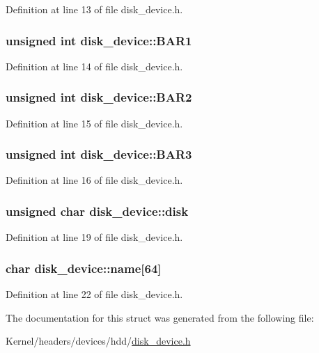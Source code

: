 Definition at line 13 of file disk\_\-device.h.

\hypertarget{structdisk__device_a066811c5884f4a33a7142a4a3bc441e2}{
\subsubsection[{BAR1}]{\setlength{\rightskip}{0pt plus 5cm}unsigned int {\bf disk\_\-device::BAR1}}}
\label{structdisk__device_a066811c5884f4a33a7142a4a3bc441e2}


Definition at line 14 of file disk\_\-device.h.

\hypertarget{structdisk__device_a63aa54abd416441bc8f21baba6f44781}{
\subsubsection[{BAR2}]{\setlength{\rightskip}{0pt plus 5cm}unsigned int {\bf disk\_\-device::BAR2}}}
\label{structdisk__device_a63aa54abd416441bc8f21baba6f44781}


Definition at line 15 of file disk\_\-device.h.

\hypertarget{structdisk__device_ab3e1b2e30dec98cc6fcd522d3e61da51}{
\subsubsection[{BAR3}]{\setlength{\rightskip}{0pt plus 5cm}unsigned int {\bf disk\_\-device::BAR3}}}
\label{structdisk__device_ab3e1b2e30dec98cc6fcd522d3e61da51}


Definition at line 16 of file disk\_\-device.h.

\hypertarget{structdisk__device_ae63dd67fa78f27e21a526856b1bcdaad}{
\subsubsection[{disk}]{\setlength{\rightskip}{0pt plus 5cm}unsigned char {\bf disk\_\-device::disk}}}
\label{structdisk__device_ae63dd67fa78f27e21a526856b1bcdaad}


Definition at line 19 of file disk\_\-device.h.

\hypertarget{structdisk__device_a805f966d368060c484d324d5d990fcf5}{
\subsubsection[{name}]{\setlength{\rightskip}{0pt plus 5cm}char {\bf disk\_\-device::name}\mbox{[}64\mbox{]}}}
\label{structdisk__device_a805f966d368060c484d324d5d990fcf5}


Definition at line 22 of file disk\_\-device.h.



The documentation for this struct was generated from the following file:\begin{DoxyCompactItemize}
\item 
Kernel/headers/devices/hdd/\hyperlink{disk__device_8h}{disk\_\-device.h}\end{DoxyCompactItemize}
